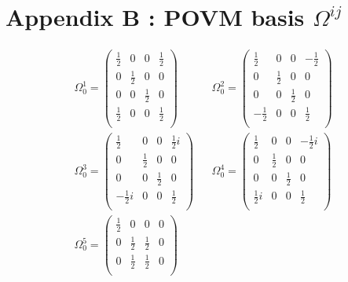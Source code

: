 \section*{Appendix B : POVM basis $\Omega^{ij}$}
\label{label:POVM_basis}
\begin{align*}
    \Omega_{0}^{1} = 
    \begin{pmatrix}
    \frac{1}{2}  &  0  &  0  &  \frac{1}{2}  \\
    0  &  \frac{1}{2}  &  0  &  0  \\
    0  &  0  &  \frac{1}{2}  &  0  \\
    \frac{1}{2}  &  0  &  0  &  \frac{1}{2}  \\
    \end{pmatrix}
    &&
    \Omega_{0}^{2} = 
    \begin{pmatrix}
    \frac{1}{2}  &  0  &  0  &  -\frac{1}{2}  \\
    0  &  \frac{1}{2}  &  0  &  0  \\
    0  &  0  &  \frac{1}{2}  &  0  \\
    -\frac{1}{2}  &  0  &  0  &  \frac{1}{2}  \\
    \end{pmatrix}
    \\
    \Omega_{0}^{3} = 
    \begin{pmatrix}
    \frac{1}{2}  &  0  &  0  &  \frac{1}{2}i  \\
    0  &  \frac{1}{2}  &  0  &  0  \\
    0  &  0  &  \frac{1}{2}  &  0  \\
    -\frac{1}{2}i  &  0  &  0  &  \frac{1}{2}  \\
    \end{pmatrix}
    &&
    \Omega_{0}^{4} = 
    \begin{pmatrix}
    \frac{1}{2}  &  0  &  0  &  -\frac{1}{2}i  \\
    0  &  \frac{1}{2}  &  0  &  0  \\
    0  &  0  &  \frac{1}{2}  &  0  \\
    \frac{1}{2}i  &  0  &  0  &  \frac{1}{2}  \\
    \end{pmatrix}
    \\
    \Omega_{0}^{5} = 
    \begin{pmatrix}
    \frac{1}{2}  &  0  &  0  &  0  \\
    0  &  \frac{1}{2}  &  \frac{1}{2}  &  0  \\
    0  &  \frac{1}{2}  &  \frac{1}{2}  &  0  \\

\end{pmatrix}
\end{align*}
